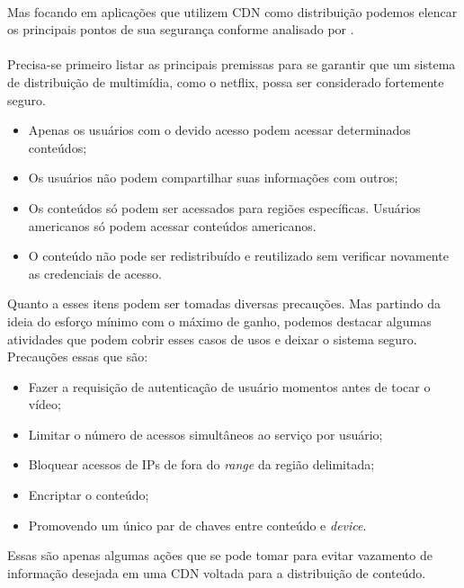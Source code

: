 \paragraph{}
Mas focando em aplica\c{c}\~oes que utilizem CDN como distribui\c{c}\~ao podemos elencar os principais pontos de sua seguran\c{c}a conforme analisado por \cite{pomelo2009analysis}.
\paragraph{}
Precisa-se primeiro listar as principais premissas para se garantir que um sistema de distribui\c{c}\~ao de multim\'idia, como o netflix, possa ser considerado fortemente seguro.
\begin{itemize}
\item Apenas os usu\'arios com o devido acesso podem acessar determinados conte\'udos;
\item Os usu\'arios n\~ao podem compartilhar suas informa\c{c}\~oes com outros;
\item Os conte\'udos s\'o podem ser acessados para regi\~oes espec\'ificas. Usu\'arios americanos s\'o podem acessar conte\'udos americanos.
\item O conte\'udo n\~ao pode ser redistribu\'ido e reutilizado sem verificar novamente as credenciais de acesso.	 
\end{itemize}

Quanto a esses itens podem ser tomadas diversas precau\c{c}\~oes. Mas partindo da ideia do esforço m\'inimo com o m\'aximo de ganho, podemos destacar algumas atividades que podem cobrir esses casos de usos e deixar o sistema seguro. Precau\c{c}\~oes essas que s\~ao:
\begin{itemize}
\item Fazer a requisi\c{c}\~ao de autentica\c{c}\~ao de usu\'ario momentos antes de tocar o v\'ideo;
\item Limitar o n\'umero de acessos simult\^aneos ao servi\c{c}o por usu\'ario;
\item Bloquear acessos de IPs de fora do \textit{range} da regi\~ao delimitada;
\item Encriptar o conte\'udo;
\item Promovendo um \'unico par de chaves entre conte\'udo e \textit{device}.
\end{itemize}

Essas s\~ao apenas algumas a\c{c}\~oes que se pode tomar para evitar vazamento de informa\c{c}\~ao desejada em uma CDN voltada para a distribui\c{c}\~ao de conte\'udo.
